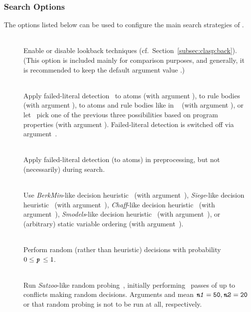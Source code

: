 \subsubsection{Search Options}\label{subsec:clasp:search}

The options listed below can be used to configure the main search
strategies of \clasp.
%
\begin{description}
\item[]~\\
Enable or disable lookback techniques (cf.\ Section~\ref{subsec:clasp:back}).
(This option is included mainly for comparison purposes, and generally,
 it is recommended to keep the default argument value .)
\item[]~\\
Apply failed-literal detection~\cite{freeman95}
to atoms (with argument ),
to rule bodies (with argument ),
to atoms and rule bodies like in \nomorepp~\cite{angelinesc05c} (with argument ),
or let \clasp\ pick one of the previous three possibilities
based on program properties (with argument ).
Failed-literal detection is switched off via argument~.
\item[]~\\
Apply failed-literal detection (to atoms) in preprocessing,
but not (necessarily) during search.
\item[]~\\
Use \emph{BerkMin}-like decision heuristic~\cite{golnov02a}
(with argument~),
\emph{Siege}-like decision heuristic~\cite{ryan04a}
(with argument~),
\emph{Chaff}-like decision heuristic~\cite{momazhzhma01a}
(with argument~),
\emph{Smodels}-like decision heuristic~\cite{siniso02a}
(with argument~),
or (arbitrary) static variable ordering
(with argument~).
\item[]~\\
Perform random (rather than heuristic) decisions
with probability $0\leq\texttt{\textit{p}}\leq 1$.
\item[]~\\
Run \emph{Satzoo}-like random probing~\cite{een03a},
initially performing~ passes of up to~ conflicts
making random decisions.
Arguments  and  mean
$\code{\textit{n1}}=\code{50},\linebreak[1]\code{\textit{n2}}=\code{20}$
or that random probing is not to be run at all, respectively.
\end{description}
